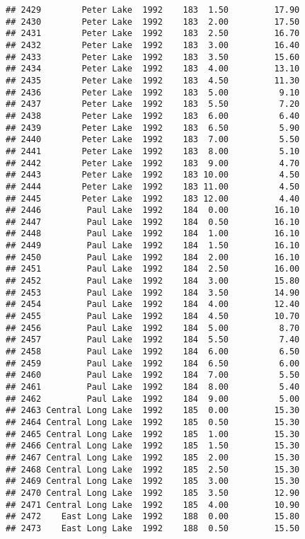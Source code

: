 \documentclass[
]{article}
\begin{document}
\begin{verbatim}
## 2429        Peter Lake  1992    183  1.50         17.90
## 2430        Peter Lake  1992    183  2.00         17.50
## 2431        Peter Lake  1992    183  2.50         16.70
## 2432        Peter Lake  1992    183  3.00         16.40
## 2433        Peter Lake  1992    183  3.50         15.60
## 2434        Peter Lake  1992    183  4.00         13.10
## 2435        Peter Lake  1992    183  4.50         11.30
## 2436        Peter Lake  1992    183  5.00          9.10
## 2437        Peter Lake  1992    183  5.50          7.20
## 2438        Peter Lake  1992    183  6.00          6.40
## 2439        Peter Lake  1992    183  6.50          5.90
## 2440        Peter Lake  1992    183  7.00          5.50
## 2441        Peter Lake  1992    183  8.00          5.10
## 2442        Peter Lake  1992    183  9.00          4.70
## 2443        Peter Lake  1992    183 10.00          4.50
## 2444        Peter Lake  1992    183 11.00          4.50
## 2445        Peter Lake  1992    183 12.00          4.40
## 2446         Paul Lake  1992    184  0.00         16.10
## 2447         Paul Lake  1992    184  0.50         16.10
## 2448         Paul Lake  1992    184  1.00         16.10
## 2449         Paul Lake  1992    184  1.50         16.10
## 2450         Paul Lake  1992    184  2.00         16.10
## 2451         Paul Lake  1992    184  2.50         16.00
## 2452         Paul Lake  1992    184  3.00         15.80
## 2453         Paul Lake  1992    184  3.50         14.90
## 2454         Paul Lake  1992    184  4.00         12.40
## 2455         Paul Lake  1992    184  4.50         10.70
## 2456         Paul Lake  1992    184  5.00          8.70
## 2457         Paul Lake  1992    184  5.50          7.40
## 2458         Paul Lake  1992    184  6.00          6.50
## 2459         Paul Lake  1992    184  6.50          6.00
## 2460         Paul Lake  1992    184  7.00          5.50
## 2461         Paul Lake  1992    184  8.00          5.40
## 2462         Paul Lake  1992    184  9.00          5.00
## 2463 Central Long Lake  1992    185  0.00         15.30
## 2464 Central Long Lake  1992    185  0.50         15.30
## 2465 Central Long Lake  1992    185  1.00         15.30
## 2466 Central Long Lake  1992    185  1.50         15.30
## 2467 Central Long Lake  1992    185  2.00         15.30
## 2468 Central Long Lake  1992    185  2.50         15.30
## 2469 Central Long Lake  1992    185  3.00         15.30
## 2470 Central Long Lake  1992    185  3.50         12.90
## 2471 Central Long Lake  1992    185  4.00         10.90
## 2472    East Long Lake  1992    188  0.00         15.80
## 2473    East Long Lake  1992    188  0.50         15.50

\end{verbatim}
\end{document}
